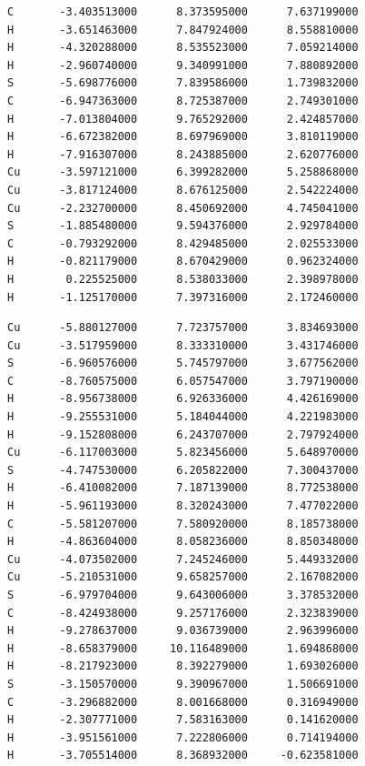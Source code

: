 \documentclass[a4paper,12pt]{article}
\begin{document}
\begin{onehalfspace}
\begin{verbatim}
C       -3.403513000      8.373595000      7.637199000
H       -3.651463000      7.847924000      8.558810000
H       -4.320288000      8.535523000      7.059214000
H       -2.960740000      9.340991000      7.880892000
S       -5.698776000      7.839586000      1.739832000
C       -6.947363000      8.725387000      2.749301000
H       -7.013804000      9.765292000      2.424857000
H       -6.672382000      8.697969000      3.810119000
H       -7.916307000      8.243885000      2.620776000
Cu      -3.597121000      6.399282000      5.258868000
Cu      -3.817124000      8.676125000      2.542224000
Cu      -2.232700000      8.450692000      4.745041000
S       -1.885480000      9.594376000      2.929784000
C       -0.793292000      8.429485000      2.025533000
H       -0.821179000      8.670429000      0.962324000
H        0.225525000      8.538033000      2.398978000
H       -1.125170000      7.397316000      2.172460000

	\end{verbatim}
	\newpage
	\begin{verbatim}
Cu      -5.880127000      7.723757000      3.834693000
Cu      -3.517959000      8.333310000      3.431746000
S       -6.960576000      5.745797000      3.677562000
C       -8.760575000      6.057547000      3.797190000
H       -8.956738000      6.926336000      4.426169000
H       -9.255531000      5.184044000      4.221983000
H       -9.152808000      6.243707000      2.797924000
Cu      -6.117003000      5.823456000      5.648970000
S       -4.747530000      6.205822000      7.300437000
H       -6.410082000      7.187139000      8.772538000
H       -5.961193000      8.320243000      7.477022000
C       -5.581207000      7.580920000      8.185738000
H       -4.863604000      8.058236000      8.850348000
Cu      -4.073502000      7.245246000      5.449332000
Cu      -5.210531000      9.658257000      2.167082000
S       -6.979704000      9.643006000      3.378532000
C       -8.424938000      9.257176000      2.323839000
H       -9.278637000      9.036739000      2.963996000
H       -8.658379000     10.116489000      1.694868000
H       -8.217923000      8.392279000      1.693026000
S       -3.150570000      9.390967000      1.506691000
C       -3.296882000      8.001668000      0.316949000
H       -2.307771000      7.583163000      0.141620000
H       -3.951561000      7.222806000      0.714194000
H       -3.705514000      8.368932000     -0.623581000
	\end{verbatim}
	

\end{onehalfspace}
\end{document}
